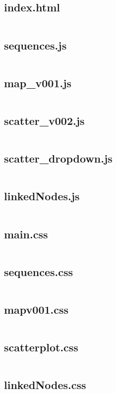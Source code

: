 \documentclass[a4paper, 11pt]{article}
\begin{document}
\subsection{index.html}
\inputminted{html}{source/index.html}

\newpage
\subsection{sequences.js}
\inputminted{js}{source/sequences.js}

\newpage
\subsection{map\_v001.js}
\inputminted{js}{source/map_v001.js}

\newpage
\subsection{scatter\_v002.js}
\inputminted{js}{source/scatter_v002.js}

\newpage
\subsection{scatter\_dropdown.js}
\inputminted{js}{source/scatter_dropdown.js}

\newpage
\subsection{linkedNodes.js}
\inputminted{js}{source/linkedNodes.js}


\newpage
\subsection{main.css}
\inputminted{css}{source/main.css}


\newpage
\subsection{sequences.css}
\inputminted{css}{source/sequences.css}


\newpage
\subsection{map\-v001.css}
\inputminted{css}{source/map-v001.css}


\newpage
\subsection{scatterplot.css}
\inputminted{css}{source/scatterplot.css}

\newpage
\subsection{linkedNodes.css}
\inputminted{css}{source/linkedNodes.css}
\end{document}
